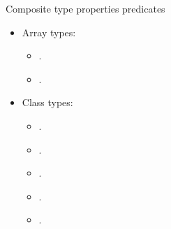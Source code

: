\begin{frame}[t,fragile]{Composite type properties predicates}
\begin{itemize}
  \item Array types:
    \begin{itemize}
      \item {}.
      \item {}.
    \end{itemize}
  
  \item Class types:
    \begin{itemize}
      \item {}.
      \item {}.
      \item {}.
      \item {}.
      \item {}.
    \end{itemize}
\end{itemize}
\end{frame}



